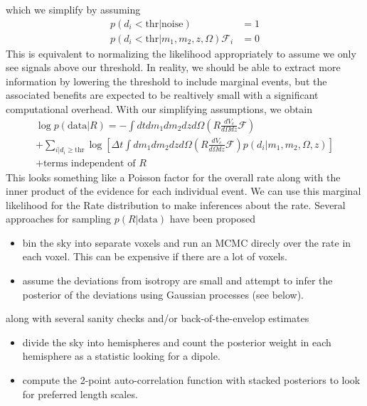 \documentclass{article}
\begin{document}
which we simplify by assuming
\begin{align}
    p(d_i<\mathrm{thr}|\mathrm{noise}) & = 1 \\
    p(d_i<\mathrm{thr}|m_1, m_2, z, \Omega)\mathcal{F}_i & = 0
\end{align}
This is equivalent to normalizing the likelihood appropriately to assume we only see signals above our threshold. 
In reality, we should be able to extract more information by lowering the threshold to include marginal events, but the associated benefits are expected to be realtively small with a significant computational overhead.
With our simplifying assumptions, we obtain
\begin{multline}
    \log p(\mathrm{data}|R) = - \int dt dm_1 dm_2 dz d\Omega \left(R \frac{dV_c}{d\Omega dz} \mathcal{F}\right) \\
         + \sum\limits_{i|d_i\geq\mathrm{thr}} \log \left[ \Delta t \int dm_1 dm_2 dz d\Omega \left(R \frac{dV_c}{d\Omega dz} \mathcal{F}\right) p(d_i|m_1, m_2, \Omega, z) \right] \\
         + \text{terms independent of }R
\end{multline}
This looks something like a Poisson factor for the overall rate along with the inner product of the evidence for each individual event.
We can use this marginal likelihood for the Rate distribution to make inferences about the rate.
Several approaches for sampling $p(R|\mathrm{data})$ have been proposed
\begin{itemize}
    \item bin the sky into separate voxels and run an MCMC direcly over the rate in each voxel. This can be expensive if there are a lot of voxels.
    \item assume the deviations from isotropy are small and attempt to infer the posterior of the deviations using Gaussian processes (see below).
\end{itemize}
along with several sanity checks and/or back-of-the-envelop estimates
\begin{itemize}
    \item divide the sky into hemispheres and count the posterior weight in each hemisphere as a statistic looking for a dipole.
    \item compute the 2-point auto-correlation function with stacked posteriors to look for preferred length scales.
\end{itemize}

\end{document}

